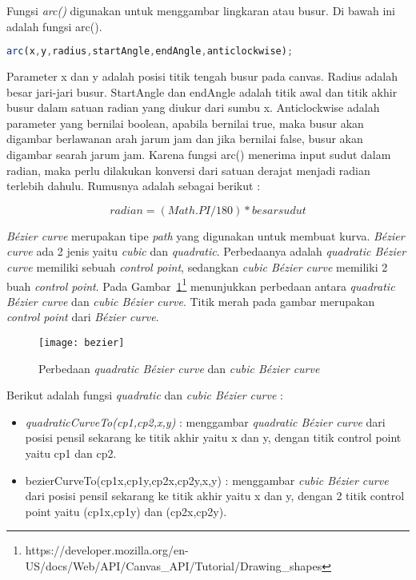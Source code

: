 Fungsi \textit{arc()} digunakan untuk menggambar lingkaran atau busur. Di bawah ini adalah fungsi arc().

\begin{lstlisting}[language=Javascript, caption=Fungsi \textit{arc()}]
	arc(x,y,radius,startAngle,endAngle,anticlockwise);
\end{lstlisting}

Parameter x dan y adalah posisi titik tengah busur pada canvas. Radius adalah besar jari-jari busur. StartAngle dan endAngle adalah titik awal dan titik akhir busur dalam satuan radian yang diukur dari sumbu x. Anticlockwise adalah parameter yang bernilai boolean, apabila bernilai true, maka busur akan digambar berlawanan arah jarum jam dan jika bernilai false, busur akan digambar searah jarum jam. Karena fungsi arc() menerima input sudut dalam radian, maka perlu dilakukan konversi dari satuan derajat menjadi radian terlebih dahulu. Rumusnya adalah sebagai berikut :

\begin{displaymath}
	radian = (Math.PI / 180) * besar sudut
\end{displaymath}	

\textit{B\'ezier curve} merupakan tipe \textit{path} yang digunakan untuk membuat kurva. \textit{B\'ezier curve} ada 2 jenis yaitu \textit{cubic} dan \textit{quadratic}. Perbedaanya adalah \textit{quadratic B\'ezier curve} memiliki sebuah \textit{control point}, sedangkan \textit{cubic B\'ezier curve} memiliki 2 buah \textit{control point}. Pada Gambar~\ref{fig:bezier}\footnote{https://developer.mozilla.org/en-US/docs/Web/API/Canvas\_API/Tutorial/Drawing\_shapes} menunjukkan perbedaan antara \textit{quadratic B\'ezier curve} dan \textit{cubic B\'ezier curve}. Titik merah pada gambar merupakan \textit{control point} dari \textit{B\'ezier curve}.

\begin{figure}[H]
	\centering  
	\texttt{[image: bezier]}
	\caption[Perbedaan \textit{quadratic B\'ezier curve} dan \textit{cubic B\'ezier curve}]{Perbedaan \textit{quadratic B\'ezier curve} dan \textit{cubic B\'ezier curve}}
	\label{fig:bezier} 
\end{figure} 

Berikut adalah fungsi \textit{quadratic} dan \textit{cubic B\'ezier curve} :
\begin{itemize}
	\item \textit{quadraticCurveTo(cp1,cp2,x,y)} : menggambar \textit{quadratic B\'ezier curve} dari posisi pensil sekarang ke titik akhir yaitu x dan y, dengan titik control point yaitu cp1 dan cp2.
	\item bezierCurveTo(cp1x,cp1y,cp2x,cp2y,x,y) : menggambar \textit{cubic B\'ezier curve} dari posisi pensil sekarang ke titik akhir yaitu x dan y, dengan 2 titik control point yaitu (cp1x,cp1y) dan (cp2x,cp2y).
\end{itemize}

